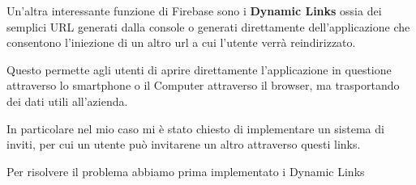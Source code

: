 
Un'altra interessante funzione di Firebase sono i \textbf{Dynamic Links}
ossia dei semplici URL generati dalla console o generati direttamente dell'applicazione
che consentono l'iniezione di un altro url a cui l'utente verrà reindirizzato.

Questo permette agli utenti di aprire direttamente l'applicazione in questione
attraverso lo smartphone o il Computer attraverso il browser, ma trasportando dei dati utili all'azienda.

In particolare nel mio caso mi è stato chiesto di implementare un sistema di inviti, per cui 
un utente può invitarene un altro attraverso questi links.

Per risolvere il problema abbiamo prima implementato i Dynamic Links

